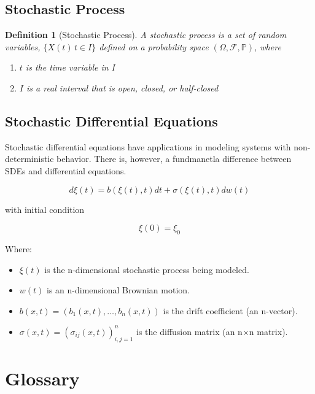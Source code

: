 \documentclass{article}
\newtheorem{definition}{Definition}
\begin{document}
\subsection{Stochastic Process}
\begin{mdframed}
\begin{definition}[Stochastic Process]
A \emph{stochastic process} is a set of random variables, $\{X(t)\, t \in I\}$ defined on a probability space $(\Omega, \mathcal{F}, \mathbb{P})$, where

\begin{enumerate}
    \item $t$ is the time variable in I
    \item $I$ is a real interval that is open, closed, or half-closed
\end{enumerate}
\end{definition}
\end{mdframed}

\subsection{Stochastic Differential Equations}
Stochastic differential equations have applications in modeling systems with non-deterministic behavior. There is, however, a fundmanetla difference between SDEs and differential equations.

$$
d\xi(t) = b(\xi(t), t)dt + \sigma(\xi(t), t)dw(t)
$$

with initial condition

$$
\xi(0) = \xi_0
$$

Where:

\begin{itemize}
    \item $ \xi(t) $ is the n-dimensional stochastic process being modeled.
    \item $ w(t) $ is an n-dimensional Brownian motion.
    \item $ b(x, t) = (b_1(x, t), \dots, b_n(x, t)) $ is the drift coefficient (an n-vector).
    \item $ \sigma(x, t) = (\sigma_{ij}(x, t))_{i,j=1}^n $ is the diffusion matrix (an n×n matrix).
\end{itemize}

\newpage
\section{Glossary}
\end{document}

